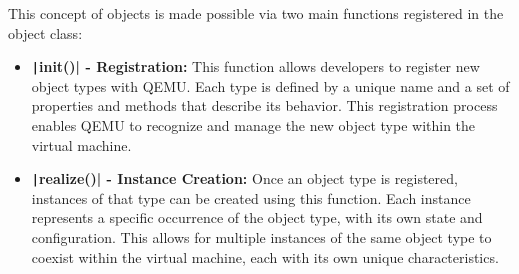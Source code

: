 This concept of objects is made possible via two main functions registered in the object class:
\begin{itemize}
    \item \textbf{\texttt|init()| - Registration:} This function allows developers to register new object types with QEMU. Each type is defined by a unique name and a set of properties and methods that describe its behavior. This registration process enables QEMU to recognize and manage the new object type within the virtual machine.
    \item \textbf{\texttt|realize()| - Instance Creation:} Once an object type is registered, instances of that type can be created using this function. Each instance represents a specific occurrence of the object type, with its own state and configuration. This allows for multiple instances of the same object type to coexist within the virtual machine, each with its own unique characteristics.
\end{itemize}

